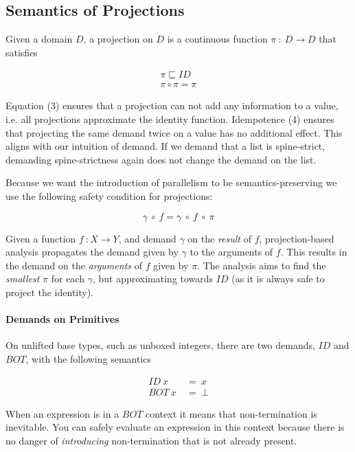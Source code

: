 \subsection{Semantics of Projections}

Given a domain $D$, a projection on $D$ is a continuous function
$\pi \ : \ D \rightarrow D$ that satisfies

\begin{align}
\pi \sqsubseteq ID \\
\pi \circ \pi = \pi
\end{align}

Equation (3) ensures that a projection can not add any information to a value,
i.e. all projections approximate the identity function. Idempotence (4) ensures
that projecting the same demand twice on a value has no additional effect. This
aligns with our intuition of demand. If we demand that a list is spine-strict,
demanding spine-strictness again does not change the demand on the list.

Because we want the introduction of parallelism to be semantics-preserving we
use the following safety condition for projections:

\begin{equation}
\gamma \ \circ \ f = \gamma \ \circ \ f \ \circ \ \pi
\end{equation}

Given a function $f \ : X \rightarrow Y$, and demand $\gamma$ on the
\emph{result} of $f$, projection-based analysis propagates the demand given by
$\gamma$ to the arguments of $f$. This results in the demand on the
\emph{arguments} of $f$ given by $\pi$.  The analysis aims to find the
\emph{smallest} $\pi$ for each $\gamma$, but approximating towards $ID$ (as
it is always safe to project the identity).

\paragraph{Demands on Primitives}
On unlifted base types, such as unboxed integers, there are two demands,
$ID$ and $BOT$, with the following semantics


\begin{align}
ID \ x \ &= \ x \\
BOT \ x \ &= \ \bot
\end{align}


When an expression is in a $BOT$ context it means that non-termination is
inevitable. You can safely evaluate an expression in this context because there
is no danger of \emph{introducing} non-termination that is not already present.

